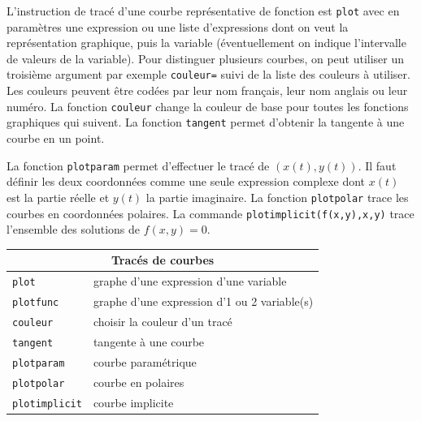\documentclass{article}
\begin{document}
\begin{giacjshere}
L'instruction de trac\'e d'une courbe repr\'esentative de fonction est \verb|plot| avec en
param\`etres une expression ou une liste d'expressions dont on
veut la repr\'esentation graphique, puis la variable (\'eventuellement
on indique l'intervalle de valeurs de la variable). 
Pour distinguer plusieurs courbes,
on peut utiliser un troisi\`eme argument par exemple
\verb|couleur=| suivi de la liste des couleurs \`a utiliser. Les
couleurs peuvent \^etre cod\'ees par leur nom fran\c{c}ais, leur nom
anglais ou leur num\'ero. La fonction \verb|couleur| change la couleur
de base pour toutes les fonctions graphiques qui suivent.
La fonction \verb|tangent| permet d'obtenir la tangente \`a une courbe en un 
point.

La fonction \verb|plotparam| permet d'effectuer le
trac\'e de $(x(t),y(t))$. Il faut d\'efinir les deux coordonn\'ees 
comme une seule expression complexe dont $x(t)$ est la partie r\'eelle 
et $y(t)$ la partie imaginaire. La fonction \verb|plotpolar| 
trace les courbes en coordonn\'ees polaires. La commande
\verb|plotimplicit(f(x,y),x,y)| trace l'ensemble des solutions de
$f(x,y)=0$.

\begin{center}
\begin{tabular}{|ll|}
\hline
\multicolumn{2}{|c|}{\bf Trac\'es de courbes}\\
\hline\hline
\verb|plot| & graphe d'une expression d'une variable\\
\verb|plotfunc| & graphe d'une expression d'1 ou 2 variable(s)\\
\verb|couleur| & choisir la couleur d'un trac\'e\\
\verb|tangent| & tangente \`a une courbe\\
\verb|plotparam| & courbe param\'etrique\\
\verb|plotpolar| & courbe en polaires\\
\verb|plotimplicit| & courbe implicite\\
\hline
\end{tabular}
\end{center}
%

\end{giacjshere}
\end{document}
